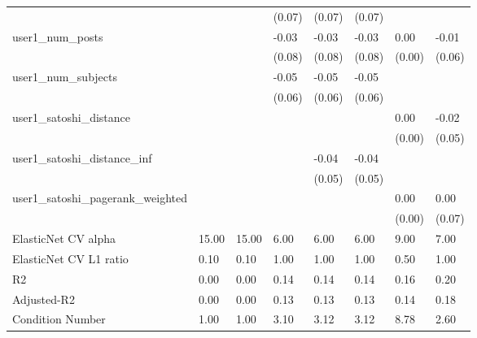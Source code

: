 \begin{table}
\begin{center}
\begin{tabular}{llllllll}
                                               &         &         & (0.07)   & (0.07)   & (0.07)   &           &          \\
user1_num_posts                                &         &         & -0.03    & -0.03    & -0.03    & 0.00      & -0.01    \\
                                               &         &         & (0.08)   & (0.08)   & (0.08)   & (0.00)    & (0.06)   \\
user1_num_subjects                             &         &         & -0.05    & -0.05    & -0.05    &           &          \\
                                               &         &         & (0.06)   & (0.06)   & (0.06)   &           &          \\
user1_satoshi_distance                         &         &         &          &          &          & 0.00      & -0.02    \\
                                               &         &         &          &          &          & (0.00)    & (0.05)   \\
user1_satoshi_distance_inf                     &         &         &          & -0.04    & -0.04    &           &          \\
                                               &         &         &          & (0.05)   & (0.05)   &           &          \\
user1_satoshi_pagerank_weighted                &         &         &          &          &          & 0.00      & 0.00     \\
                                               &         &         &          &          &          & (0.00)    & (0.07)   \\
ElasticNet CV alpha                            & 15.00   & 15.00   & 6.00     & 6.00     & 6.00     & 9.00      & 7.00     \\
ElasticNet CV  L1 ratio                        & 0.10    & 0.10    & 1.00     & 1.00     & 1.00     & 0.50      & 1.00     \\
R2                                             & 0.00    & 0.00    & 0.14     & 0.14     & 0.14     & 0.16      & 0.20     \\
Adjusted-R2                                    & 0.00    & 0.00    & 0.13     & 0.13     & 0.13     & 0.14      & 0.18     \\
Condition Number                               & 1.00    & 1.00    & 3.10     & 3.12     & 3.12     & 8.78      & 2.60     \\

\end{tabular}
\end{center}
\end{table}
